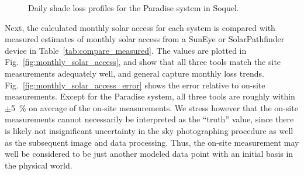 \documentclass[twocolumn,10pt]{asme2ej}
\begin{document}
\begin{figure}[h!]
\begin{center}
\end{center}
\caption{Daily shade loss profiles for the Paradise system in Soquel.}
\label{fig:paradise_soquel_profiles}
\end{figure}

Next, the calculated monthly solar access for each system is compared with measured estimates of monthly solar access from a SunEye or SolarPathfinder device in Table~\ref{tab:compare_measured}.  The values are plotted in Fig.~\ref{fig:monthly_solar_access}, and show that all three tools match the site measurements adequately well, and general capture monthly loss trends.  Fig.~\ref{fig:monthly_solar_access_error} shows the error relative to on-site measurements.  Except for the Paradise system, all three tools are roughly within $\pm$5~\% on average of the on-site measurements.  We stress however that the on-site measurements cannot necessarily be interpreted as the ``truth'' value, since there is likely not insignificant uncertainty in the sky photographing procedure as well as the subsequent image and data processing.  Thus, the on-site measurement may well be considered to be just another modeled data point with an initial basis in the physical world.  
\end{document}
